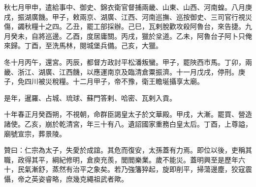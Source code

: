 \begin{pinyinscope}
秋七月甲申，遣給事中、御史、錦衣衛官督捕兩畿、山東、山西、河南蝗。八月庚戌，振湖廣饑。甲子，敕兩京、湖廣、江西、河南巡撫、巡按御史、三司官行視災傷，蠲秋糧十之四。乙丑，罷工部採辦。己巳，瓦剌脫歡攻殺阿魯台，來告捷。九月癸未，自將巡邊。乙酉，度居庸關。丙戌，獵於坌道。乙未，阿魯台子阿卜只俺來歸。丁酉，至洗馬林，閱城堡兵備。己亥，大獵。

冬十月丙午，還宮。丙辰，都督方政討平松潘叛蠻。甲子，罷陜西市馬。丁卯，兩畿、浙江、湖廣、江西饑，以應運南京及臨清倉粟振濟。十一月戊戌，停刑。庚子，免四川被災稅糧。十二月甲子，帝不豫，衛王瞻埏攝享太廟。

是年，暹羅、占城、琉球、蘇門答剌、哈密、瓦剌入貢。

十年春正月癸酉朔，不視朝，命群臣謁皇太子於文華殿。甲戌，大漸。罷買、營造諸使。乙亥，崩於乾清宮，年三十有八。遺詔國家重務白皇太后。丁酉，上尊謚，廟號宣宗，葬景陵。

贊曰：仁宗為太子，失愛於成誼。其危而復安，太孫蓋有力焉。即位以後，吏稱其職，政得其平，綱紀修明，倉庾充羨，閭閻樂業。歲不能災。蓋明興至是歷年六十，民氣漸舒，蒸然有治平之象矣。若乃強籓猝起，旋即削平，掃蕩邊塵，狡寇震懾，帝之英姿睿略，庶幾克繩祖武者歟。


\end{pinyinscope}